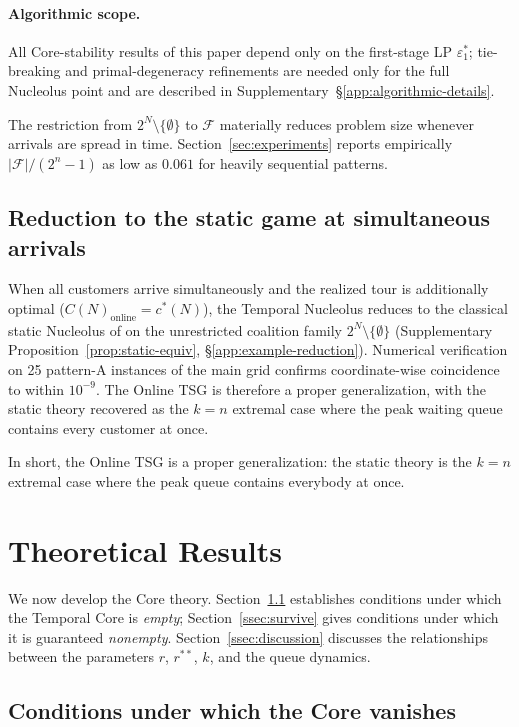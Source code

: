 \documentclass[11pt]{article}
\theoremstyle{plain}
\theoremstyle{definition}
\theoremstyle{remark}
\newcommand{\F}{\mathcal{F}}
\newcommand{\cstar}{c^{\ast}}
\begin{document}
\paragraph{Algorithmic scope.} All Core-stability results of this paper depend only on the first-stage LP $\varepsilon_1^{\ast}$; tie-breaking and primal-degeneracy refinements are needed only for the full Nucleolus point and are described in Supplementary~\S\ref{app:algorithmic-details}.

The restriction from $2^N\setminus\{\emptyset\}$ to $\F$ materially reduces problem size whenever arrivals are spread in time. Section~\ref{sec:experiments} reports empirically $|\F|/(2^n-1)$ as low as $0.061$ for heavily sequential patterns.

\subsection{Reduction to the static game at simultaneous arrivals}

When all customers arrive simultaneously and the realized tour is additionally optimal ($C(N)_{\text{online}}=\cstar(N)$), the Temporal Nucleolus reduces to the classical static Nucleolus of \citet{potters1992tsg} on the unrestricted coalition family $2^N\setminus\{\emptyset\}$ (Supplementary Proposition~\ref{prop:static-equiv}, \S\ref{app:example-reduction}). Numerical verification on 25 pattern-A instances of the main grid confirms coordinate-wise coincidence to within $10^{-9}$. The Online TSG is therefore a proper generalization, with the static theory recovered as the $k=n$ extremal case where the peak waiting queue contains every customer at once.

In short, the Online TSG is a proper generalization: the static theory is the $k=n$ extremal case where the peak queue contains everybody at once.

\section{Theoretical Results}
\label{sec:theory}

We now develop the Core theory. Section~\ref{ssec:empty} establishes conditions under which the Temporal Core is \emph{empty}; Section~\ref{ssec:survive} gives conditions under which it is guaranteed \emph{nonempty}. Section~\ref{ssec:discussion} discusses the relationships between the parameters $r$, $r^{\ast\ast}$, $k$, and the queue dynamics.

\subsection{Conditions under which the Core vanishes}
\label{ssec:empty}
\end{document}
